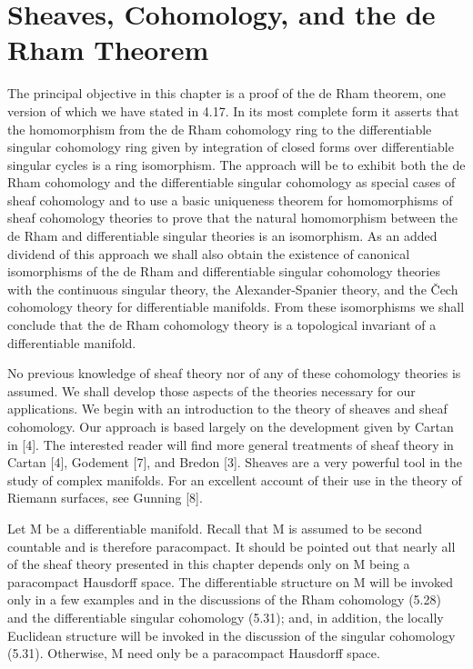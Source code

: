 \chapter{Sheaves, Cohomology, and the de Rham Theorem}

The principal objective in this chapter is a proof of the de Rham theorem, one version of which we have stated in 4.17. In its most complete form it asserts that the homomorphism from the de Rham cohomology ring to the differentiable singular cohomology ring given by integration of closed forms over differentiable singular cycles is a ring isomorphism. The approach will be to exhibit both the de Rham cohomology and the differentiable singular cohomology as special cases of sheaf cohomology and to use a basic uniqueness theorem for homomorphisms of sheaf cohomology theories to prove that the natural homomorphism between the de Rham and differentiable singular theories is an isomorphism. As an added dividend of this approach we shall also obtain the existence of canonical isomorphisms of the de Rham and differentiable singular cohomology theories with the continuous singular theory, the Alexander-Spanier theory, and the Čech cohomology theory for differentiable manifolds. From these isomorphisms we shall conclude that the de Rham cohomology theory is a topological invariant of a differentiable manifold.

No previous knowledge of sheaf theory nor of any of these cohomology theories is assumed. We shall develop those aspects of the theories necessary for our applications. We begin with an introduction to the theory of sheaves and sheaf cohomology. Our approach is based largely on the development given by Cartan in [4]. The interested reader will find more general treatments of sheaf theory in Cartan [4], Godement [7], and Bredon [3]. Sheaves are a very powerful tool in the study of complex manifolds. For an excellent account of their use in the theory of Riemann surfaces, see Gunning [8].

Let M be a differentiable manifold. Recall that M is assumed to be second countable and is therefore paracompact. It should be pointed out that nearly all of the sheaf theory presented in this chapter depends only on M being a paracompact Hausdorff space. The differentiable structure on M will be invoked only in a few examples and in the discussions of the Rham cohomology (5.28) and the differentiable singular cohomology (5.31); and, in addition, the locally Euclidean structure will be invoked in the discussion of the singular cohomology (5.31). Otherwise, M need only be a paracompact Hausdorff space.

